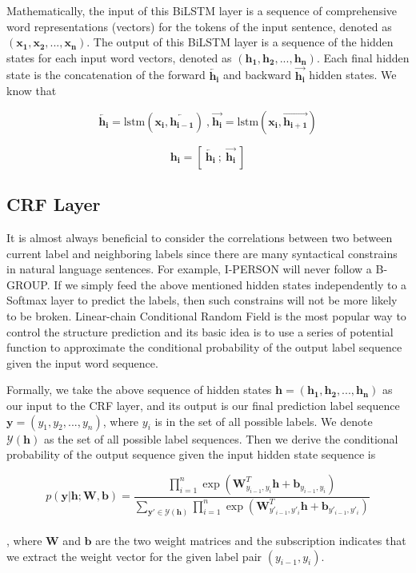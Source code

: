 Mathematically, the input of this BiLSTM layer is a sequence of comprehensive word representations (vectors) for the tokens of the input sentence,  denoted as 
$( \mathbf{x_1}, \mathbf{x_2},...,\mathbf{x_n})$. 
The output of this BiLSTM layer is a sequence of the hidden states for each input word vectors, denoted as 
$( \mathbf{h_1}, \mathbf{h_2},...,\mathbf{h_n})$. 
Each final hidden state is the concatenation of the forward $\overleftarrow{\mathbf{h_i}}$ and backward $\overrightarrow{\mathbf{h_i}}$ hidden states.
We know that 

$$\overleftarrow{\mathbf{h_i}}= \text{lstm}(\mathbf{x_i}, \overleftarrow{\mathbf{h_{i-1}}})~\text{,}~\overrightarrow{\mathbf{h_i}}= \text{lstm}(\mathbf{x_i}, \overrightarrow{\mathbf{h_{i+1}}})$$ 

$$\mathbf{h_i} = \left[~\overleftarrow{\mathbf{h_i}}~;~\overrightarrow{\mathbf{h_i}}~\right]$$


\subsection{CRF Layer}
It is almost always beneficial to consider the correlations between two between current label and neighboring labels since there are many syntactical constrains in natural language sentences. 
For example, I-PERSON will never follow a B-GROUP. 
If we simply feed the above mentioned hidden states independently to a Softmax layer to predict the labels, then such constrains will not be more likely to be broken. 
Linear-chain Conditional Random Field is the most popular way to control the structure prediction and its basic idea is to use a series of potential function to approximate the conditional probability of the output label sequence given the input word sequence. 

Formally, we take the above sequence of hidden states  $ \mathbf{h} = ( \mathbf{h_1}, \mathbf{h_2},...,\mathbf{h_n})$ as our input to the CRF layer, and its output is our final prediction label sequence $\mathbf{y} = ( {y_1}, {y_2},...,{y_n})$, where $y_i$ is in the set of all possible labels. 
We denote $\mathcal{Y}(\mathbf{h})$ as the set of all possible label sequences.
Then we derive the conditional probability of the output sequence given the input hidden state sequence is 

{\small $$ p(\mathbf{y}|\mathbf{h}; \mathbf{W},\mathbf{b}) 
= \frac{\prod_{i=1}^n \exp(\mathbf{W}^T_{y_{i-1},y_{i}}\mathbf{h} + \mathbf{b}_{y_{i-1},y_{i}})}
{ \sum_{\mathbf{y'} \in \mathcal{Y}(\mathbf{h})} \prod_{i=1}^n \exp(\mathbf{W}^T_{y'_{i-1},y'_{i}}\mathbf{h} + \mathbf{b}_{y'_{i-1},y'_{i}})} 
$$}\\
\newpage
\noindent
, where $\mathbf W$ and $\mathbf b$ are the two weight matrices and the subscription indicates that we extract the weight vector for the given label pair $(y_{i-1},y_i)$. 

